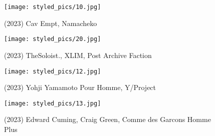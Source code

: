 \begin{minipage}[h!]{0.5\textwidth}
    \begin{figure}[H]\centering
        \texttt{[image: styled\_pics/10.jpg]}
        \caption*{(2023) Cav Empt, Namacheko}
    \end{figure}
\end{minipage}
\begin{minipage}[h!]{0.5\textwidth}
    \begin{figure}[H]\centering
        \texttt{[image: styled\_pics/20.jpg]}
        \caption*{(2023) TheSoloist., XLIM, Post Archive Faction}
    \end{figure}
\end{minipage}
\begin{minipage}[h!]{0.5\textwidth}
    \begin{figure}[H]\centering
        \texttt{[image: styled\_pics/12.jpg]}
        \caption*{(2023) Yohji Yamamoto Pour Homme, Y/Project}
    \end{figure}
\end{minipage}
\begin{minipage}[h!]{0.5\textwidth}
    \begin{figure}[H]\centering
        \texttt{[image: styled\_pics/13.jpg]}
        \caption*{(2023) Edward Cuming, Craig Green, Comme des Garcons Homme Plus}
    \end{figure}
\end{minipage}
